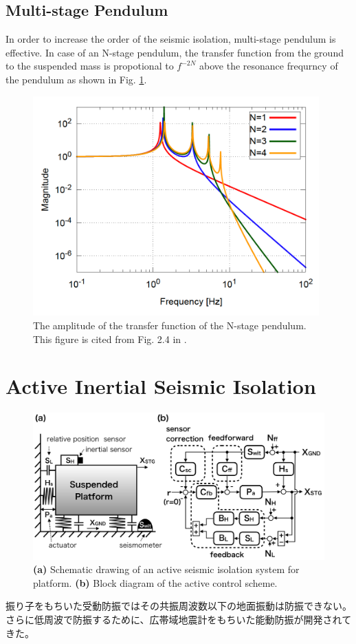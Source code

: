 \subsection{Multi-stage Pendulum}
In order to increase the order of the seismic isolation, multi-stage pendulum is effective. In case of an N-stage pendulum, the transfer function from the ground to the suspended mass is propotional to $f^{-2N}$ above the resonance frequrncy of the pendulum as shown in Fig. \ref{img:img502}. 
\begin{figure}[h]
  \begin{center}   
    \includegraphics[width=11cm]{./img_chap5/img502.png}
    \caption{The amplitude of the transfer function of the N-stage pendulum. This figure is cited from Fig. 2.4 in \cite{sekiguchi2016astudy}.} \label{img:img502}
  \end{center}
\end{figure}


\section{Active Inertial Seismic Isolation}\label{sec:512}
\begin{figure}[h]
  \begin{center}
    \includegraphics[width=13.5cm]{./img_chap5/img503.png}
    \caption{{\bf(a)} Schematic drawing of an active seismic isolation system for platform. {\bf(b)} Block diagram of the active control scheme.} \label{img:img503}
  \end{center}
\end{figure}
振り子をもちいた受動防振ではその共振周波数以下の地面振動は防振できない。さらに低周波で防振するために、広帯域地震計をもちいた能動防振が開発されてきた\cite{matichard2015seismic}。

